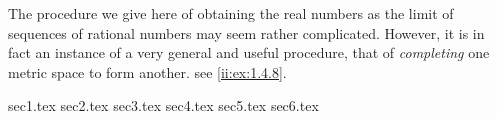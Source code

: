 \begin{note}
  The procedure we give here of obtaining the real numbers as the limit of sequences of rational numbers may seem rather complicated.
  However, it is in fact an instance of a very general and useful procedure, that of \emph{completing} one metric space to form another.
  see \cref{ii:ex:1.4.8}.
\end{note}

{sec1.tex}
{sec2.tex}
{sec3.tex}
{sec4.tex}
{sec5.tex}
{sec6.tex}

